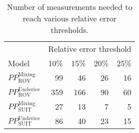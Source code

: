 \begin{table}[ht]
\centering
\begin{tabular}{lrrrr}
  \toprule
  & \multicolumn{4}{c}{Relative error threshold} \\
 Model & 10\% & 15\% & 20\% & 25\% \\
 \midrule
$PP^{\mathrm{Mixing}}_{\mathrm{ROV}}$ & 99 & 46 & 26 & 16 \\ 
  $PP^{\mathrm{Underice}}_{\mathrm{ROV}}$ & 359 & 166 & 90 & 60 \\ 
  $PP^{\mathrm{Mixing}}_{\mathrm{SUIT}}$ & 27 & 13 & 7 & 5 \\ 
  $PP^{\mathrm{Underice}}_{\mathrm{SUIT}}$ & 86 & 40 & 23 & 15 \\ 
   \bottomrule
\end{tabular}
\caption{Number of measurements needed to reach various relative error thresholds.} 
\end{table}
